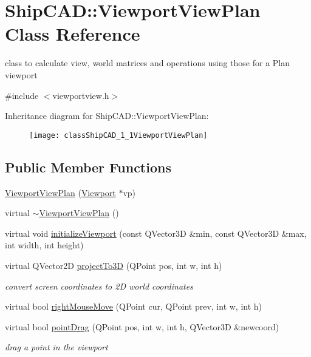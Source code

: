\hypertarget{classShipCAD_1_1ViewportViewPlan}{}\section{Ship\+C\+AD\+:\+:Viewport\+View\+Plan Class Reference}
\label{classShipCAD_1_1ViewportViewPlan}


class to calculate view, world matrices and operations using those for a Plan viewport  




{\ttfamily \#include $<$viewportview.\+h$>$}

Inheritance diagram for Ship\+C\+AD\+:\+:Viewport\+View\+Plan\+:\begin{figure}[H]
\begin{center}
\leavevmode
\texttt{[image: classShipCAD\_1\_1ViewportViewPlan]}
\end{center}
\end{figure}
\subsection*{Public Member Functions}
\begin{DoxyCompactItemize}
\item 
\hyperlink{classShipCAD_1_1ViewportViewPlan_a71852fca01ee2c986927f15b37246567}{Viewport\+View\+Plan} (\hyperlink{classShipCAD_1_1Viewport}{Viewport} $\ast$vp)
\item 
virtual \hyperlink{classShipCAD_1_1ViewportViewPlan_aa00e0a2e6845f8c1382ab834879c2bfd}{$\sim$\+Viewport\+View\+Plan} ()
\item 
virtual void \hyperlink{classShipCAD_1_1ViewportViewPlan_a05836d5f48d28a0681a1a3214dc4aeac}{initialize\+Viewport} (const Q\+Vector3D \&min, const Q\+Vector3D \&max, int width, int height)
\item 
virtual Q\+Vector2D \hyperlink{classShipCAD_1_1ViewportViewPlan_adcc5e44591098694df045848798be804}{project\+To3D} (Q\+Point pos, int w, int h)
\begin{DoxyCompactList}\small\item\em convert screen coordinates to 2D world coordinates \end{DoxyCompactList}\item 
virtual bool \hyperlink{classShipCAD_1_1ViewportViewPlan_a932d06d121e39a91676053c667fc78d5}{right\+Mouse\+Move} (Q\+Point cur, Q\+Point prev, int w, int h)
\item 
virtual bool \hyperlink{classShipCAD_1_1ViewportViewPlan_aaac7978a626640198a7a92daae63bc51}{point\+Drag} (Q\+Point pos, int w, int h, Q\+Vector3D \&newcoord)
\begin{DoxyCompactList}\small\item\em drag a point in the viewport \end{DoxyCompactList}\end{DoxyCompactItemize}
